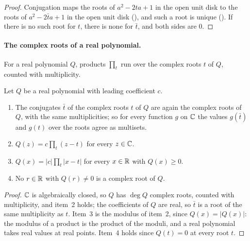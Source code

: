 \begin{proof}
\leanok
{}
Conjugation maps the roots of $a^2 - 2ta + 1$ in the open unit disk to the roots of
$a^2 - 2\bar t a + 1$ in the open unit disk (), and such a root
is unique (). If there is no such root for $t$, there is none
for $\bar t$, and both sides are $0$.
\end{proof}

\paragraph{The complex roots of a real polynomial.}
For a real polynomial $Q$, products $\prod_t$ run over the complex roots $t$ of $Q$, counted
with multiplicity.

\begin{lemma}
\label{lem:daub-real-poly-roots}
\leanok
Let $Q$ be a real polynomial with leading coefficient $c$.
\begin{enumerate}
  \item The conjugates $\bar t$ of the complex roots $t$ of $Q$ are again the complex roots of
    $Q$, with the same multiplicities; so for every function $g$ on $\mathbb{C}$ the values $g(\bar t)$
    and $g(t)$ over the roots agree as multisets.
  \item $Q(z) = c \prod_t (z - t)$ for every $z \in \mathbb{C}$.
  \item $Q(x) = |c| \prod_t |x - t|$ for every $x \in \mathbb{R}$ with $Q(x) \geq 0$.
  \item No $r \in \mathbb{R}$ with $Q(r) \neq 0$ is a complex root of $Q$.
\end{enumerate}
\end{lemma}

\begin{proof}
\leanok
$\mathbb{C}$ is algebraically closed, so $Q$ has $\deg Q$ complex roots, counted with multiplicity, and
item~2 holds; the coefficients of $Q$ are real, so $\bar t$ is a root of the same multiplicity
as $t$. Item~3 is the modulus of item~2, since $Q(x) = |Q(x)|$: the modulus of a product is the
product of the moduli, and a real polynomial takes real values at real points. Item~4 holds
since $Q(t) = 0$ at every root $t$.
\end{proof}

